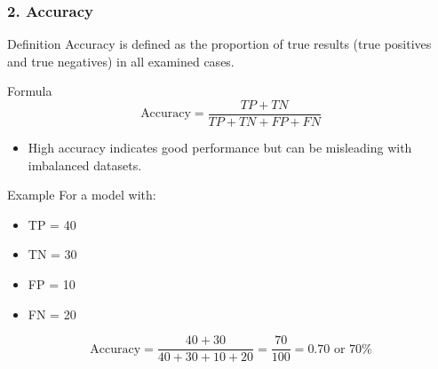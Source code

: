 \documentclass[aspectratio=169]{beamer}
\begin{document}
\begin{frame}[fragile]
    \frametitle{2. Accuracy}
    \begin{block}{Definition}
        Accuracy is defined as the proportion of true results (true positives and true negatives) in all examined cases.
    \end{block}
    
    \begin{block}{Formula}
    \begin{equation}
    \text{Accuracy} = \frac{TP + TN}{TP + TN + FP + FN}
    \end{equation}
    \end{block}
    
    \begin{itemize}
        \item High accuracy indicates good performance but can be misleading with imbalanced datasets.
    \end{itemize}
    
    \begin{block}{Example}
        For a model with:
        \begin{itemize}
            \item TP = 40
            \item TN = 30
            \item FP = 10
            \item FN = 20
        \end{itemize}
        \[
        \text{Accuracy} = \frac{40 + 30}{40 + 30 + 10 + 20} = \frac{70}{100} = 0.70 \text{ or } 70\%
        \]
    \end{block}
\end{frame}
\end{document}
